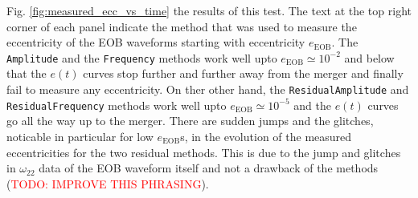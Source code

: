 \documentclass[aps,prd,amsmath,floats,floatfix, twocolumn,
superscriptaddress,nofootinbib,showpacs]{revtex4-1}
\newcommand{\red}{\textcolor{red}}
\newcommand{\TODO}[1]{\red{TODO: #1}}
\begin{document}
Fig. \ref{fig:measured_ecc_vs_time} the results of this test. The text
at the top right corner of each panel indicate the method that was
used to measure the eccentricity of the EOB waveforms starting with
eccentricity $e_{\text{EOB}}$. The \texttt{Amplitude} and the
\texttt{Frequency} methods work well upto $e_{\text{EOB}} \simeq
10^{-2}$ and below that the $e(t)$ curves stop further and further
away from the merger and finally fail to measure any eccentricity. On
ther other hand, the \texttt{ResidualAmplitude} and
\texttt{ResidualFrequency} methods work well upto $e_{\text{EOB}}
\simeq 10^{-5}$ and the $e(t)$ curves go all the way up to the
merger. There are sudden jumps and the glitches, noticable in
particular for low $e_{\text{EOB}}$s, in the evolution of the measured
eccentricities for the two residual methods.  This is due to the jump
and glitches in $\omega_{22}$ data of the EOB waveform itself and not
a drawback of the methods (\TODO{IMPROVE THIS PHRASING}).
\end{document}
